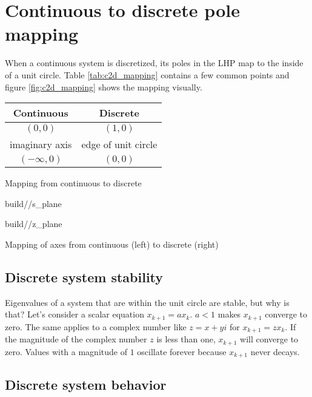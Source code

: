 \section{Continuous to discrete pole mapping}

When a continuous system is discretized, its poles in the LHP map to the inside
of a unit circle. Table \ref{tab:c2d_mapping} contains a few common points and
figure \ref{fig:c2d_mapping} shows the mapping visually.
\begin{booktable}
  \begin{tabular}{|cc|}
    \hline
    \rowcolor{headingbg}
    \textbf{Continuous} & \textbf{Discrete} \\
    \hline
    $(0, 0)$ & $(1, 0)$ \\
    imaginary axis & edge of unit circle \\
    $(-\infty, 0)$ & $(0, 0)$ \\
    \hline
  \end{tabular}
  \caption{Mapping from continuous to discrete}
  \label{tab:c2d_mapping}
\end{booktable}
\begin{bookfigure}
  \begin{minisvg}{2}{build/\chapterpath/s_plane}
  \end{minisvg}
  \hfill
  \begin{minisvg}{2}{build/\chapterpath/z_plane}
  \end{minisvg}
  \caption{Mapping of axes from continuous (left) to discrete (right)}
  \label{fig:c2d_mapping}
\end{bookfigure}

\subsection{Discrete system stability}

Eigenvalues of a \gls{system} that are within the unit circle are stable, but
why is that? Let's consider a scalar equation $x_{k + 1} = ax_k$. $a < 1$ makes
$x_{k + 1}$ converge to zero. The same applies to a complex number like
$z = x + yi$ for $x_{k + 1} = zx_k$. If the magnitude of the complex number $z$
is less than one, $x_{k+1}$ will converge to zero. Values with a magnitude of
$1$ oscillate forever because $x_{k+1}$ never decays.

\subsection{Discrete system behavior}


